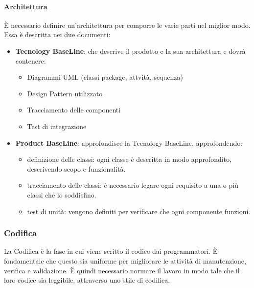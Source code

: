 \paragraph{Architettura}
È necessario definire un'architettura per comporre le varie parti nel miglior modo. Essa è descritta nei due documenti:
\begin{itemize}
  \item \textbf{Tecnology BaseLine}: che descrive il prodotto e la sua architettura e dovrà contenere:
  \begin{itemize}
    \item Diagrammi UML (classi package, attvità, sequenza)
    \item Design Pattern utilizzato
    \item Tracciamento delle componenti
    \item Test di integrazione
  \end{itemize}
  \item \textbf{Product BaseLine}: approfondisce la Tecnology BaseLine, approfondendo:
  \begin{itemize}
    \item definizione delle classi: ogni classe è descritta in modo approfondito, descrivendo scopo e funzionalità.
    \item tracciamento delle classi: è necessario legare ogni requisito a una o più classi che lo soddisfino.
    \item test di unità: vengono definiti per verificare che ogni componente funzioni.
  \end{itemize}
\end{itemize}
\subsubsection{Codifica}
La Codifica è la fase in cui viene scritto il codice dai programmatori. È fondamentale che questo sia uniforme per migliorare le attività di manutenzione, verifica e validazione. È quindi necessario normare il lavoro in modo tale che il loro codice sia leggibile, attraverso uno stile di codifica.
